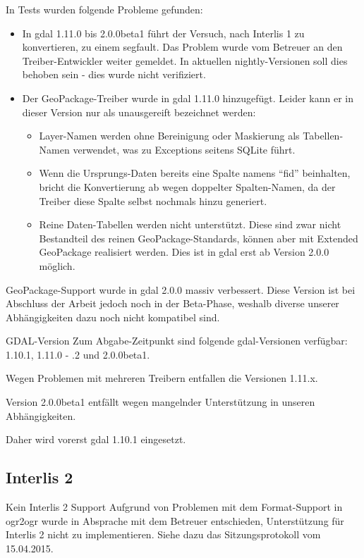 In Tests wurden folgende Probleme gefunden:
\begin{itemize}
\item In \gls{gdal} 1.11.0 bis 2.0.0beta1 führt der Versuch, nach Interlis 1 zu konvertieren, zu einem \gls{segfault}. Das Problem wurde vom Betreuer an den Treiber-Entwickler weiter gemeldet. In aktuellen nightly-Versionen soll dies behoben sein - dies wurde nicht verifiziert.
\item Der GeoPackage-Treiber wurde in \gls{gdal} 1.11.0 hinzugefügt. Leider kann er in dieser Version nur als unausgereift bezeichnet werden:
  \begin{itemize}
  \item Layer-Namen werden ohne Bereinigung oder Maskierung als Tabellen-Namen verwendet, was zu Exceptions seitens SQLite führt.
  \item Wenn die Ursprungs-Daten bereits eine Spalte namens ``fid'' beinhalten, bricht die Konvertierung ab wegen doppelter Spalten-Namen, da der Treiber diese Spalte selbst nochmals hinzu generiert.
  \item Reine Daten-Tabellen werden nicht unterstützt. Diese sind zwar nicht Bestandteil des reinen GeoPackage-Standards, können aber mit Extended GeoPackage realisiert werden. Dies ist in \gls{gdal} erst ab Version 2.0.0 möglich.
  \end{itemize}
\end{itemize}

GeoPackage-Support wurde in \gls{gdal} 2.0.0 massiv verbessert. Diese Version ist bei Abschluss der Arbeit jedoch noch in der Beta-Phase, weshalb diverse unserer Abhängigkeiten dazu noch nicht kompatibel sind.

\begin{decision}[label=dec:pd:gdal-version]{GDAL-Version}
Zum Abgabe-Zeitpunkt sind folgende \gls{gdal}-Versionen verfügbar: 1.10.1, 1.11.0 - .2 und 2.0.0beta1.

Wegen Problemen mit mehreren Treibern entfallen die Versionen 1.11.x.

Version 2.0.0beta1 entfällt wegen mangelnder Unterstützung in unseren Abhängigkeiten.

Daher wird vorerst \gls{gdal} 1.10.1 eingesetzt.
\end{decision}

\subsection{Interlis 2}
\begin{decision}[label=dec:pd:no_interlis2]{Kein Interlis 2 Support}
Aufgrund von Problemen mit dem Format-Support in ogr2ogr wurde in Absprache mit dem Betreuer entschieden, Unterstützung für Interlis 2 nicht zu implementieren. Siehe dazu das Sitzungsprotokoll vom 15.04.2015.
\end{decision}
